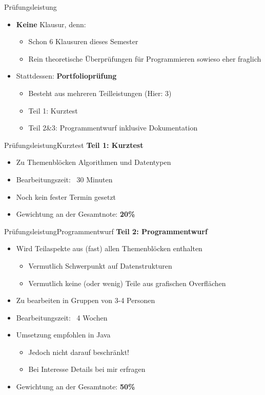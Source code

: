 \begin{frame}{Prüfungsleistung}{}
	\begin{itemize}
	\item \textbf{Keine} Klausur, denn:
		\begin{itemize}
			\item Schon 6 Klausuren dieses Semester
			\item Rein theoretische Überprüfungen für Programmieren sowieso eher fraglich
		\end{itemize}
	\item Stattdessen: \textbf{Portfolioprüfung}
		\begin{itemize}
			\item Besteht aus mehreren Teilleistungen (Hier: 3)
			\item Teil 1: Kurztest
			\item Teil 2\&3: Programmentwurf inklusive Dokumentation 
		\end{itemize}
	\end{itemize}
\end{frame}

\begin{frame}{Prüfungsleistung}{Kurztest}
	\textbf{Teil 1: Kurztest}
	\begin{itemize}
		\item Zu Themenblöcken Algorithmen und Datentypen
		\item Bearbeitungszeit: ~30 Minuten
		\item Noch kein fester Termin gesetzt
		\item Gewichtung an der Gesamtnote: \textbf{20\%}
	\end{itemize}
\end{frame}

\begin{frame}{Prüfungsleistung}{Programmentwurf}
	\textbf{Teil 2: Programmentwurf}
	\begin{itemize}
		\item Wird Teilaspekte aus (fast) allen Themenblöcken enthalten
		\begin{itemize}
			\item Vermutlich Schwerpunkt auf Datenstrukturen
			\item Vermutlich keine (oder wenig) Teile aus grafischen Overflächen
		\end{itemize}
		\item Zu bearbeiten in Gruppen von 3-4 Personen
		\item Bearbeitungszeit: ~4 Wochen
		\item Umsetzung empfohlen in Java
		\begin{itemize}
			\item Jedoch nicht darauf beschränkt!
			\item Bei Interesse Details bei mir erfragen
		\end{itemize}
		\item Gewichtung an der Gesamtnote: \textbf{50\%}
	\end{itemize}
\end{frame}

